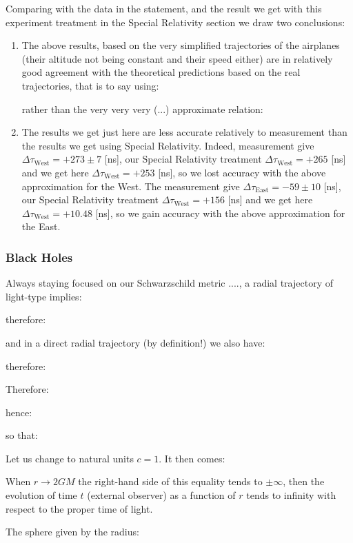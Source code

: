 	Comparing with the data in the statement, and the result we get with this experiment treatment in the Special Relativity section we draw two conclusions:
	\begin{enumerate}
		\item The above results, based on the very simplified trajectories of the airplanes (their altitude not being constant and their speed either) are in relatively good agreement with the theoretical predictions based on the real trajectories, that is to say using:
		
		rather than the very very very (...) approximate relation:
		
		
		\item The results we get just here are less accurate relatively to measurement than the results we get using Special Relativity. Indeed, measurement give $\Delta \tau_\text{West}=+273 \pm 7$ [ns], our Special Relativity treatment $\Delta \tau_\text{West}=+265$ [ns] and we get here $\Delta \tau_\text{West}=+253$ [ns], so we lost accuracy with the above approximation for the West. The measurement give $\Delta \tau_\text{East}=-59 \pm10$ [ns], our Special Relativity treatment $\Delta \tau_\text{West}=+156$ [ns] and we get here $\Delta \tau_\text{West}=+10.48$ [ns], so we gain accuracy with the above approximation for the East. 
		
	\end{enumerate}
	
	\pagebreak
	\subsubsection{Black Holes}\label{black hole}
	Always staying focused on our Schwarzschild metric ...., a radial trajectory of light-type implies:
	
	therefore:
	
	and in a direct radial trajectory (by definition!) we also have:
	
	therefore:
	
	Therefore:
	
	hence:
	
	so that:
	
	Let us change to natural units $c=1$. It then comes:
	
	When $r\rightarrow 2GM$ the right-hand side of this equality tends to $\pm \infty$, then the evolution of time $t$ (external observer) as a function of $r$ tends to infinity with respect to the proper time of light.

	The sphere given by the radius:
	
